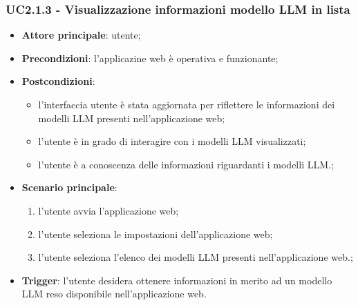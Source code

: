 \documentclass[10pt, a4paper]{article}
\begin{document}
    \subsubsection{UC2.1.3 - Visualizzazione informazioni modello LLM in lista}
    \begin{itemize}
        \item \textbf{Attore principale}: utente;
        \item \textbf{Precondizioni}: l'applicazine web è operativa e funzionante;
        \item \textbf{Postcondizioni}: 
        \begin{itemize}
            \item l'interfaccia utente è stata aggiornata per riflettere le informazioni dei modelli LLM presenti nell'applicazione web;
            \item l'utente è in grado di interagire con i modelli LLM visualizzati;
            \item l'utente è a conoscenza delle informazioni riguardanti i modelli LLM.; 
        \end{itemize}
        \item \textbf{Scenario principale}:
            \begin{enumerate}
                \item l'utente avvia l'applicazione web;
                \item l'utente seleziona le impostazioni dell'applicazione web;
                \item l'utente seleziona l'elenco dei modelli LLM presenti nell'applicazione web.;
            \end{enumerate}
        \item \textbf{Trigger}: l'utente desidera ottenere informazioni in merito ad un modello LLM reso disponibile nell'applicazione web.
    \end{itemize}
    
\end{document}
